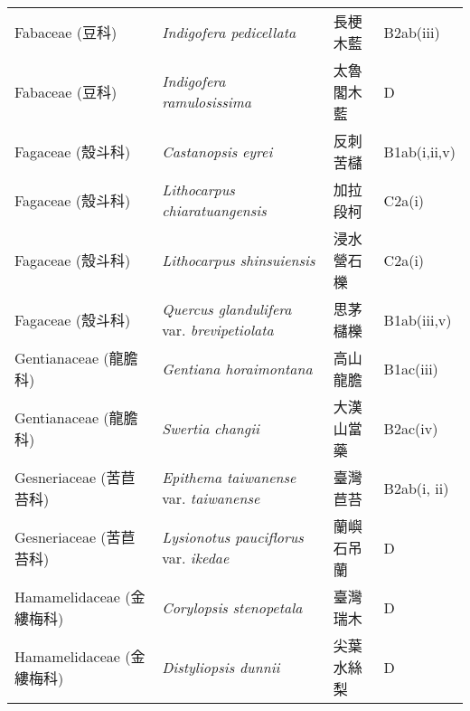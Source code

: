 \begin{longtable}{p{3cm}p{5cm}p{3cm}p{4cm}}
    Fabaceae (豆科) & \textit{Indigofera pedicellata}  & 長梗木藍 & B2ab(iii) \index{Indigofera@\textit{Indigofera}!pedicellata@\textit{pedicellata}}  \index{長梗木藍} \\
    Fabaceae (豆科) & \textit{Indigofera ramulosissima}  & 太魯閣木藍 & D \index{Indigofera@\textit{Indigofera}!ramulosissima@\textit{ramulosissima}}  \index{太魯閣木藍} \\
    Fagaceae (殼斗科) & \textit{Castanopsis eyrei}  & 反刺苦櫧 & B1ab(i,ii,v) \index{Castanopsis@\textit{Castanopsis}!eyrei@\textit{eyrei}}  \index{反刺苦櫧} \\
    Fagaceae (殼斗科) & \textit{Lithocarpus chiaratuangensis}  & 加拉段柯 & C2a(i) \index{Lithocarpus@\textit{Lithocarpus}!chiaratuangensis@\textit{chiaratuangensis}}  \index{加拉段柯} \\
    Fagaceae (殼斗科) & \textit{Lithocarpus shinsuiensis}  & 浸水營石櫟 & C2a(i) \index{Lithocarpus@\textit{Lithocarpus}!shinsuiensis@\textit{shinsuiensis}}  \index{浸水營石櫟} \\
    Fagaceae (殼斗科) & \textit{Quercus glandulifera} var. \textit{brevipetiolata}  & 思茅櫧櫟 & B1ab(iii,v) \index{Quercus@\textit{Quercus}!glandulifera@\textit{glandulifera}!var. brevipetiolata@var. \textit{brevipetiolata}}  \index{思茅櫧櫟} \\
    Gentianaceae (龍膽科) & \textit{Gentiana horaimontana}  & 高山龍膽 & B1ac(iii) \index{Gentiana@\textit{Gentiana}!horaimontana@\textit{horaimontana}}  \index{高山龍膽} \\
    Gentianaceae (龍膽科) & \textit{Swertia changii}  & 大漢山當藥 & B2ac(iv) \index{Swertia@\textit{Swertia}!changii@\textit{changii}}  \index{大漢山當藥} \\
    Gesneriaceae (苦苣苔科) & \textit{Epithema taiwanense} var. \textit{taiwanense}  & 臺灣苣苔 & B2ab(i, ii) \index{Epithema@\textit{Epithema}!taiwanense@\textit{taiwanense}!var. taiwanense@var. \textit{taiwanense}}  \index{臺灣苣苔} \\
    Gesneriaceae (苦苣苔科) & \textit{Lysionotus pauciflorus} var. \textit{ikedae}  & 蘭嶼石吊蘭 & D \index{Lysionotus@\textit{Lysionotus}!pauciflorus@\textit{pauciflorus}!var. ikedae@var. \textit{ikedae}}  \index{蘭嶼石吊蘭} \\
    Hamamelidaceae (金縷梅科) & \textit{Corylopsis stenopetala}  & 臺灣瑞木 & D \index{Corylopsis@\textit{Corylopsis}!stenopetala@\textit{stenopetala}}  \index{臺灣瑞木} \\
    Hamamelidaceae (金縷梅科) & \textit{Distyliopsis dunnii}  & 尖葉水絲梨 & D \index{Distyliopsis@\textit{Distyliopsis}!dunnii@\textit{dunnii}}  \index{尖葉水絲梨} \\

\end{longtable}
